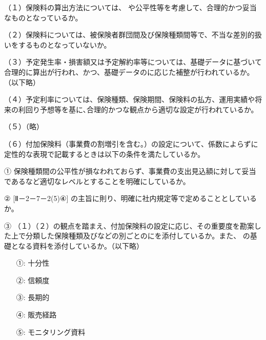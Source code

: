 \documentclass[report,gutter=10mm,fore-edge=10mm,uplatex,dvipdfmx]{jlreq}
\begin{document}
（１）保険料の算出方法については、 や公平性等を考慮して、合理的かつ妥当なものとなっているか。

（２）保険料については、被保険者群団間及び保険種類間等で、不当な差別的扱いをするものとなっていないか。

（３）予定発生率・損害額又は予定解約率等については、基礎データに基づいて合理的に算出が行われ、かつ、基礎データのに応じた補整が行われているか。（以下略）

（４）予定利率については、保険種類、保険期間、保険料の払方、運用実績や将来の利回り予想等を基に､合理的かつな観点から適切な設定が行われているか。

（５）（略）

（６）付加保険料（事業費の割増引を含む｡）の設定について、係数によらずに定性的な表現で記載するときは以下の条件を満たしているか。

① 保険種類間の公平性が損なわれておらず、事業費の支出見込額に対して妥当であるなど適切なレベルとすることを明確にしているか。

② [Ⅱ－2－7－2(5)④] の主旨に則り、明確に社内規定等で定めることとしているか。

③ （１）（２）の観点を踏まえ、付加保険料の設定に応じ、その重要度を勘案した上で分類した保険種類及びなどの別ごとのにを添付しているか。また、 の基礎となる資料を添付しているか。（以下略）

\answer{}
\begin{itemize}
\item[ ①:] 十分性
\item[ ②:] 信頼度
\item[ ③:] 長期的
\item[ ④:] 販売経路
\item[ ⑤:] モニタリング資料
\end{itemize}
\end{document}
